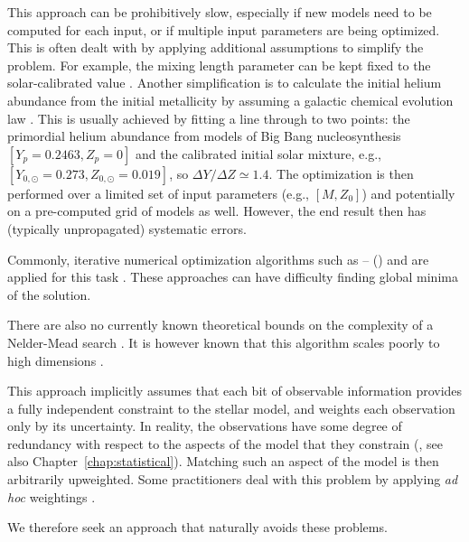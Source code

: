 \begin{description}
    \setlength{\itemindent}{0pt}
    \item[Speed.] This approach can be prohibitively slow, especially if new models need to be computed for each input, or if multiple input parameters are being optimized. 
    This is often dealt with by applying additional assumptions to simplify the problem. 
    For example, the mixing length parameter can be kept fixed to the solar-calibrated value \citep[e.g.,][]{2015MNRAS.452.2127S,2017ApJ...835..173S}. 
    Another simplification is to calculate the initial helium abundance from the initial metallicity by assuming a galactic chemical evolution law \citep[e.g.,][]{2015MNRAS.452.2127S, 2017ApJ...835..173S}. 
    This is usually achieved by fitting a line through to two points: the primordial helium abundance from models of Big Bang nucleosynthesis $[Y_p=0.2463,Z_p=0]$ \citep[e.g.,][]{2014JCAP...10..050C} and the calibrated initial solar mixture, e.g., ${[Y_{0,\odot}=0.273,Z_{0,\odot}=0.019]}$, so ${\Delta Y/\Delta Z \simeq 1.4}$. 
    The optimization is then performed over a limited set of input parameters (e.g., ${[M,Z_0]}$) and potentially on a pre-computed grid of models as well. 
    However, the end result then has (typically unpropagated) systematic errors. 
    
    \item[Local Minima.] Commonly, iterative numerical optimization algorithms such as
    \citeauthor{10.2307/43633451}--\citeauthor{10.2307/2098941} (\citeyear{10.2307/43633451,10.2307/2098941})
    and %
    are applied for this task \citep[e.g.,][]{2014A&A...569A..21L, 2015A&A...582A..25A}. 
    These approaches can have difficulty finding global minima of the solution. 
    
    There are also no currently known theoretical bounds on the complexity of a Nelder-Mead search \citep{singer1999complexity}. 
    It is however known that this algorithm scales poorly to high dimensions \citep[e.g.,][]{Chen2015}. 
    
    \item[Redundancy.] This approach implicitly assumes that each bit of observable information provides a fully independent constraint to the stellar model, and weights each observation only by its uncertainty. 
    In reality, the observations have some degree of redundancy with respect to the aspects of the model that they constrain (, see also Chapter~\ref{chap:statistical}). 
    Matching such an aspect of the model is then arbitrarily upweighted. 
    Some practitioners deal with this problem by applying \emph{ad hoc} weightings \citep[e.g.,][]{2013apjs..208....4p}. 
\end{description}
We therefore seek an approach that naturally avoids these problems. 

